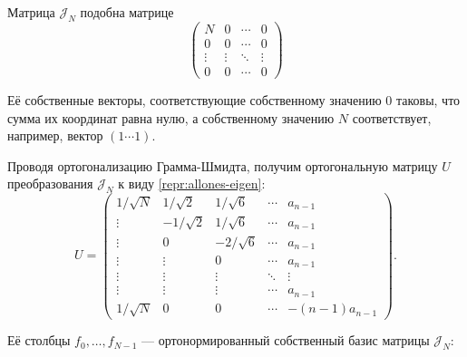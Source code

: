 \begin{lemma}
    Матрица \( \mathscr{J}_{N} \) подобна матрице
    \begin{equation}\label{repr:allones-eigen}
        \begin{pmatrix}
            N       & 0      & \cdots & 0 \\
            0       & 0      & \cdots & 0 \\
            \vdots  & \vdots & \ddots & \vdots  \\
            0       & 0      & \cdots & 0
        \end{pmatrix}
    \end{equation}

    Её собственные векторы, соответствующие собственному значению \( 0 \)
    таковы, что сумма их координат равна нулю,
    а собственному значению \( N \) соответствует, например,
    вектор \( \left(1\cdots 1\right) \).

    Проводя ортогонализацию Грамма-Шмидта,
    получим ортогональную матрицу \( U \) преобразования \( \mathscr{J}_{N} \)
    к виду \eqref{repr:allones-eigen}:
    \begin{equation}\label{eq:diagtransform}
    U =
    \begin{pmatrix}
        1/\sqrt N &  1/\sqrt2 & 1/\sqrt6   & \cdots & a_{n-1} \\
        \vdots    & -1/\sqrt2 & 1/\sqrt6   & \cdots & a_{n-1} \\
        \vdots    & 0         & -2/\sqrt6  & \cdots & a_{n-1} \\
        \vdots    & \vdots    & 0          & \cdots & a_{n-1} \\
        \vdots    & \vdots    & \vdots     & \ddots & \vdots  \\
        \vdots    & \vdots    & \vdots     & \cdots & a_{n-1} \\
        1/\sqrt N & 0         & 0          & \cdots & -(n-1)a_{n-1}
        \end{pmatrix}.
        \end{equation}

        \begin{minipage}{0.9\textwidth}
            Её столбцы \( f_0, \ldots, f_{N-1} \)
            --- ортонормированный собственный базис матрицы \( \mathscr{J}_{N} \):


\end{minipage}
\end{lemma}
